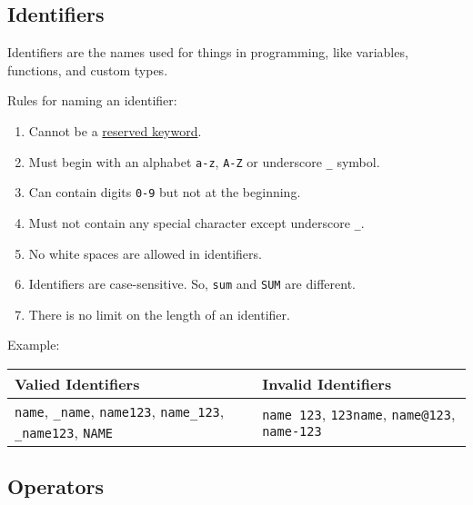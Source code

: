 \documentclass[
]{article}
\providecommand{\tightlist}{%
  \setlength{\itemsep}{0pt}\setlength{\parskip}{0pt}}
\begin{document}
\hypertarget{identifiers}{%
\subsection{Identifiers}\label{identifiers}}

Identifiers are the names used for things in programming, like
variables, functions, and custom types.

Rules for naming an identifier:

\begin{enumerate}
\def\labelenumi{\arabic{enumi}.}
\tightlist
\item
  Cannot be a \protect\hyperlink{keywords}{reserved keyword}.
\item
  Must begin with an alphabet \texttt{a-z}, \texttt{A-Z} or underscore
  \texttt{\_} symbol.
\item
  Can contain digits \texttt{0-9} but not at the beginning.
\item
  Must not contain any special character except underscore \texttt{\_}.
\item
  No white spaces are allowed in identifiers.
\item
  Identifiers are case-sensitive. So, \texttt{sum} and \texttt{SUM} are
  different.
\item
  There is no limit on the length of an identifier.
\end{enumerate}

Example:

\begin{longtable}[]{@{}ll@{}}
\toprule
\begin{minipage}[b]{0.53\columnwidth}\raggedright
Valied Identifiers\strut
\end{minipage} & \begin{minipage}[b]{0.41\columnwidth}\raggedright
Invalid Identifiers\strut
\end{minipage}\tabularnewline
\midrule
\endhead
\begin{minipage}[t]{0.53\columnwidth}\raggedright
\texttt{name}, \texttt{\_name}, \texttt{name123}, \texttt{name\_123},
\texttt{\_name123}, \texttt{NAME}\strut
\end{minipage} & \begin{minipage}[t]{0.41\columnwidth}\raggedright
\texttt{name\ 123}, \texttt{123name}, \texttt{name@123},
\texttt{name-123}\strut
\end{minipage}\tabularnewline
\bottomrule
\end{longtable}

\hypertarget{operators}{%
\subsection{Operators}\label{operators}}
\end{document}
